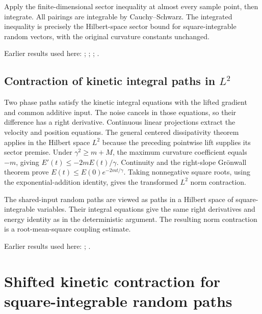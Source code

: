 \documentclass[11pt,a4paper]{report}
\begin{document}
Apply the finite-dimensional sector inequality at almost every sample point, then integrate. All pairings are integrable by Cauchy–Schwarz. The integrated inequality is precisely the Hilbert-space sector bound for square-integrable random vectors, with the original curvature constants unchanged.



Earlier results used here: \cite[Section~3.10.2]{LangevinLean2026ULASC}; \cite[Section~3.10.3]{LangevinLean2026ULASC}; \cite[Section~3.13.2]{LangevinLean2026ULASC}; \cite[Section~3.13.3]{LangevinLean2026ULASC}.
\subsection{\texorpdfstring{Contraction of kinetic integral paths in \(L^{2}\)}{Contraction of kinetic integral paths in L²}}
\label{report-step-KineticLangevin-LpContraction-lean-2}


Two phase paths satisfy the kinetic integral equations with the lifted gradient and common additive input. The noise cancels in those equations, so their difference has a right derivative. Continuous linear projections extract the velocity and position equations. The general centered dissipativity theorem applies in the Hilbert space \(L^{2}\) because the preceding pointwise lift supplies its sector premise. Under \(\gamma^2\ge m+M\), the maximum curvature coefficient equals \(-m\), giving \(E'(t)\le-2mE(t)/\gamma\). Continuity and the right-slope Grönwall theorem prove \(E(t)\le E(0)e^{-2mt/\gamma}\). Taking nonnegative square roots, using the exponential-addition identity, gives the transformed \(L^{2}\) norm contraction.



The shared-input random paths are viewed as paths in a Hilbert space of square-integrable variables. Their integral equations give the same right derivatives and energy identity as in the deterministic argument. The resulting norm contraction is a root-mean-square coupling estimate.



Earlier results used here: \cite[Section~3.13.2]{LangevinLean2026ULASC}; \cite[Section~3.13.5]{LangevinLean2026ULASC}.
\section{\texorpdfstring{Shifted kinetic contraction for square-integrable random paths}{Shifted kinetic contraction for square-integrable random paths}}
\label{proof-module-KineticLangevin-LpGeneralContraction-lean}
\end{document}

